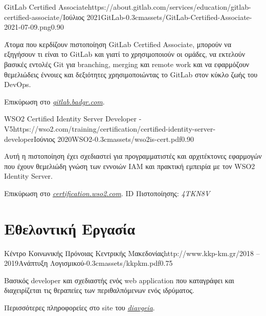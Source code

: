 \documentclass{mycv}
\begin{document}
	\vspace{0.5cm}

    \begin{EntryDatedLogo}{GitLab Certified Associate}{https://about.gitlab.com/services/education/gitlab-certified-associate/}{Ιούλιος 2021}{GitLab}{-0.3cm}{assets/GitLab-Certified-Associate-2021-07-09.png}{0.90}
    	\vspace{-0.2cm}
		\begin{Itemize}
			\item Άτομα που κερδίζουν πιστοποίηση GitLab Certified Associate, μπορούν να εξηγήσουν τι είναι το GitLab και γιατί το χρησιμοποιούν οι ομάδες, να εκτελούν βασικές εντολές Git για branching, merging και remote work και να εφαρμόζουν θεμελιώδεις έννοιες και δεξιότητες χρησιμοποιώντας το GitLab στον κύκλο ζωής του DevOps.
			\item Επικύρωση στο \href{https://gitlab.badgr.com/public/assertions/Hw6j8Th9SyKNj8ehsQkqAw}{\textit{gitlab.badgr.com}}.
		\end{Itemize}
	\end{EntryDatedLogo}

	\vspace{0.5cm}

	\begin{EntryDatedLogo}{WSO2 Certified Identity Server
			Developer - V5}{https://wso2.com/training/certification/certified-identity-server-developer}{Ιούνιος 2020}{WSO2}{-0.3cm}{assets/wso2is-cert.pdf}{0.90}
		\vspace{-0.2cm}
		\begin{Itemize}
			\item Αυτή η πιστοποίηση έχει σχεδιαστεί για προγραμματιστές και αρχιτέκτονες εφαρμογών που έχουν θεμελιώδη γνώση των εννοιών IAM και πρακτική εμπειρία με τον WSO2 Ιdentity Server. 
			\item Επικύρωση στο \href{https://certification.wso2.com}{\textit{certification.wso2.com}}. ID Πιστοποίησης: \textit{4TKN8V}
		\end{Itemize}
	\end{EntryDatedLogo}

	\section{Εθελοντική Εργασία}
	\begin{EntryDatedLogo}{Κέντρο Κοινωνικής Πρόνοιας Κεντρικής Μακεδονίας}{http://www.kkp-km.gr/}{2018 -- 2019}{Ανάπτυξη Λογισμικού}{-0.3cm}{assets/kkpkm.pdf}{0.75}
		\vspace{-0.2cm}
		\begin{Itemize}
			\item Βασικός developer και σχεδιαστής ενός web application που καταγράφει και διαχειρίζεται τις θεραπείες των περιθαλπόμενων ενός ιδρύματος.
			\item Περισσότερες πληροφορείες στο site του  \href{https://diavgeia.gov.gr/decision/view/\%CE\%A8\%CE\%A6\%CE\%A1\%CE\%93\%CE\%9F\%CE\%9E\%CE\%A7\%CE\%A3-\%CE\%A0\%CE\%93\%CE\%A6}{\textit{diavgeia}}.
		\end{Itemize}
	\end{EntryDatedLogo}
\end{document}
